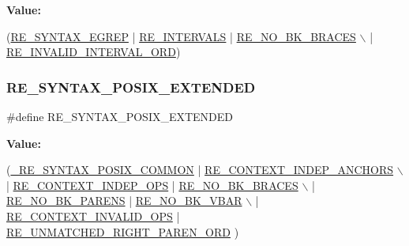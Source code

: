 {\bfseries Value\+:}
\begin{DoxyCode}
(\hyperlink{a00092_a19229061580484f7e9c58872061e8986}{RE\_SYNTAX\_EGREP} | \hyperlink{a00092_a377bd32fc62adedc890f74cd18845aa9}{RE\_INTERVALS} | \hyperlink{a00092_a924b9782a779a0db37e3c858967d60af}{RE\_NO\_BK\_BRACES}         \(\backslash\)
   | \hyperlink{a00092_aa745ecea482e459da4e4dd64a004da90}{RE\_INVALID\_INTERVAL\_ORD})
\end{DoxyCode}
\mbox{\label{a00092_a18701b3ee3894b158993efa18f3958ec}} 
\subsubsection{\texorpdfstring{R\+E\+\_\+\+S\+Y\+N\+T\+A\+X\+\_\+\+P\+O\+S\+I\+X\+\_\+\+E\+X\+T\+E\+N\+D\+ED}{RE\_SYNTAX\_POSIX\_EXTENDED}}
{\footnotesize\ttfamily \#define R\+E\+\_\+\+S\+Y\+N\+T\+A\+X\+\_\+\+P\+O\+S\+I\+X\+\_\+\+E\+X\+T\+E\+N\+D\+ED}

{\bfseries Value\+:}
\begin{DoxyCode}
(\hyperlink{a00092_a7ff4656f125a3d46461419e33451db1b}{\_RE\_SYNTAX\_POSIX\_COMMON}  | \hyperlink{a00092_a544bf7770a00eaaa62374a00fea08a2d}{RE\_CONTEXT\_INDEP\_ANCHORS}         
      \(\backslash\)
   | \hyperlink{a00092_aa96ee57fb2be85936dbb14f2b4c44b50}{RE\_CONTEXT\_INDEP\_OPS}   | \hyperlink{a00092_a924b9782a779a0db37e3c858967d60af}{RE\_NO\_BK\_BRACES}                \(\backslash\)
   | \hyperlink{a00092_af2f17f18a9c771c91d963f466f559e68}{RE\_NO\_BK\_PARENS}        | \hyperlink{a00092_a834997e69569c41f0394d6ee120051a0}{RE\_NO\_BK\_VBAR}             \(\backslash\)
   | \hyperlink{a00092_ae344a4e6129c8d549a88cd5f45e86adb}{RE\_CONTEXT\_INVALID\_OPS} | \hyperlink{a00092_af1907a994cab6bd73ad14677b126a64b}{RE\_UNMATCHED\_RIGHT\_PAREN\_ORD}
      )
\end{DoxyCode}
\mbox{\label{a00092_a0e359abad3e9318675fe89bb6b30f3ef}} 
